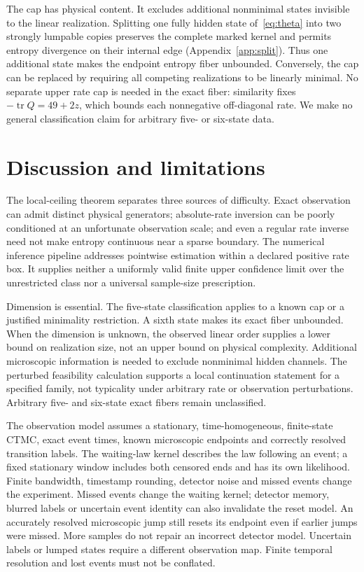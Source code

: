 \documentclass[aps,pre,onecolumn,11pt,longbibliography,notitlepage]{revtex4-2}
\newcommand{\1}{\mathbf 1}
\newcommand{\tr}{\operatorname{tr}}
\begin{document}
The cap has physical content. It excludes additional nonminimal states invisible to the linear realization. Splitting one fully hidden state of~\eqref{eq:theta} into two strongly lumpable copies preserves the complete marked kernel and permits entropy divergence on their internal edge (Appendix~\ref{app:split}). Thus one additional state makes the endpoint entropy fiber unbounded. Conversely, the cap can be replaced by requiring all competing realizations to be linearly minimal. No separate upper rate cap is needed in the exact fiber: similarity fixes $-\tr Q=49+2z$, which bounds each nonnegative off-diagonal rate. We make no general classification claim for arbitrary five- or six-state data.




\section{Discussion and limitations}\label{sec:limitations}
The local-ceiling theorem separates three sources of difficulty. Exact observation can admit distinct physical generators; absolute-rate inversion can be poorly conditioned at an unfortunate observation scale; and even a regular rate inverse need not make entropy continuous near a sparse boundary. The numerical inference pipeline addresses pointwise estimation within a declared positive rate box. It supplies neither a uniformly valid finite upper confidence limit over the unrestricted class nor a universal sample-size prescription.

Dimension is essential. The five-state classification applies to a known cap or a justified minimality restriction. A sixth state makes its exact fiber unbounded. When the dimension is unknown, the observed linear order supplies a lower bound on realization size, not an upper bound on physical complexity. Additional microscopic information is needed to exclude nonminimal hidden channels. The perturbed feasibility calculation supports a local continuation statement for a specified family, not typicality under arbitrary rate or observation perturbations. Arbitrary five- and six-state exact fibers remain unclassified.

The observation model assumes a stationary, time-homogeneous, finite-state CTMC, exact event times, known microscopic endpoints and correctly resolved transition labels. The waiting-law kernel describes the law following an event; a fixed stationary window includes both censored ends and has its own likelihood. Finite bandwidth, timestamp rounding, detector noise and missed events change the experiment. Missed events change the waiting kernel; detector memory, blurred labels or uncertain event identity can also invalidate the reset model. An accurately resolved microscopic jump still resets its endpoint even if earlier jumps were missed. More samples do not repair an incorrect detector model. Uncertain labels or lumped states require a different observation map. Finite temporal resolution and lost events must not be conflated.
\end{document}
